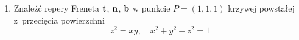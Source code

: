 \documentclass[a4paper,11pt]{article}
\begin{document}
\begin{enumerate}
\item Znaleźć repery Freneta $\mathbf{t}$, $\mathbf{n}$, $\mathbf{b}$ w punkcie
  $P = (1, 1, 1)$ krzywej powstałej z~przecięcia powierzchni
  \begin{equation}
    \label{eq:5}
    z^{ 2 } = xy, \quad
    x^{ 2 } + y^{ 2 } - z^{ 2 } = 1
  \end{equation}



























\end{enumerate}
\end{document}
